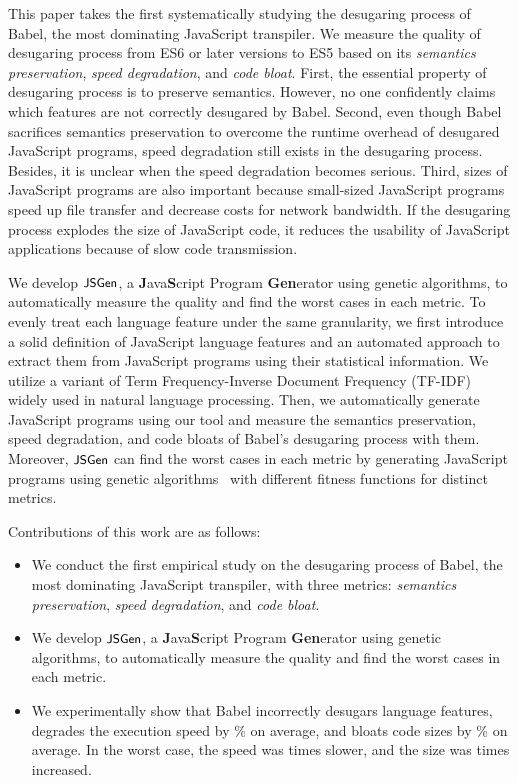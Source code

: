 This paper takes the first systematically studying the desugaring process of
Babel, the most dominating JavaScript transpiler. We measure the quality of
desugaring process from ES6 or later versions to ES5 based on its
\textit{semantics preservation}, \textit{speed degradation}, and \textit{code
bloat}. First, the essential property of desugaring process is to preserve
semantics. However, no one confidently claims which features are not correctly
desugared by Babel. Second, even though Babel sacrifices semantics preservation
to overcome the runtime overhead of desugared JavaScript programs, speed
degradation still exists in the desugaring process. Besides, it is unclear when
the speed degradation becomes serious. Third, sizes of JavaScript programs are
also important because small-sized JavaScript programs speed up file transfer
and decrease costs for network bandwidth. If the desugaring process explodes the
size of JavaScript code, it reduces the usability of JavaScript applications
because of slow code transmission.

We develop $\textsf{\small JSGen}$, a \textbf{J}ava\textbf{S}cript Program \textbf{Gen}erator
using genetic algorithms, to automatically measure the quality and find the
worst cases in each metric. To evenly treat each language feature under the same
granularity, we first introduce a solid definition of JavaScript language
features and an automated approach to extract them from JavaScript programs
using their statistical information. We utilize a variant of Term
Frequency-Inverse Document Frequency (TF-IDF)~\cite{tf, idf} widely used in
natural language processing. Then, we automatically generate JavaScript
programs using our tool and measure the semantics preservation, speed
degradation, and code bloats of Babel's desugaring process with them. Moreover,
$\textsf{\small JSGen}$ can find the worst cases in each metric by generating JavaScript
programs using genetic algorithms~\cite{ga1, ga2, ga3, ga4} with different
fitness functions for distinct metrics.

Contributions of this work are as follows:
\begin{itemize}

  \item We conduct the first empirical study on the desugaring process of Babel,
    the most dominating JavaScript transpiler, with three metrics:
    \textit{semantics preservation}, \textit{speed degradation}, and
    \textit{code bloat}.

  \item We develop $\textsf{\small JSGen}$, a \textbf{J}ava\textbf{S}cript Program
    \textbf{Gen}erator using genetic algorithms, to automatically measure the
    quality and find the worst cases in each metric.

  \item We experimentally show that Babel incorrectly desugars 
    language features, degrades the execution speed by \% on
    average, and bloats code sizes by \% on average. In the worst
    case, the speed was  times slower, and the size was 
    times increased.
\end{itemize}
